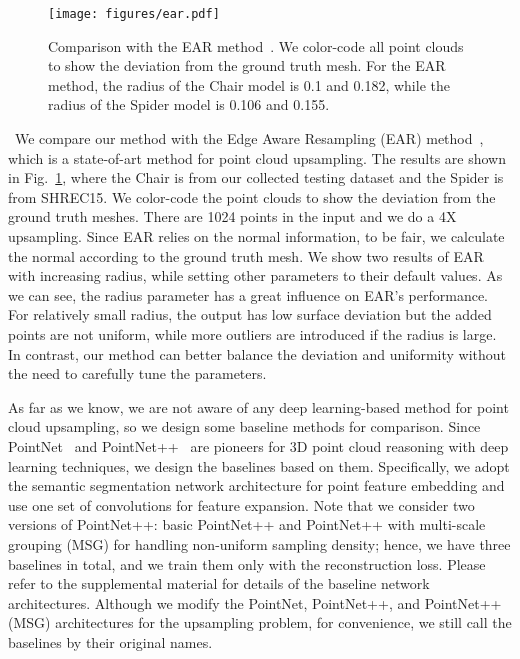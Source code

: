 \begin{figure}[t]
	\centering
	\texttt{[image: figures/ear.pdf]}\vspace{1mm}
	\caption{Comparison with the EAR method~\cite{huang2013edge}.
We color-code all point clouds to show the deviation from the ground truth mesh.
For the EAR method, the radius of the Chair model is 0.1 and 0.182, while the radius of the Spider model is 0.106 and 0.155.}
	\label{fig:ear}
	\vspace{-2mm}
\end{figure}

 \
We compare our method with the Edge Aware Resampling (EAR) method~\cite{huang2013edge}, which is a state-of-art method for point cloud upsampling.
The results are shown in Fig.~\ref{fig:ear}, where the  Chair is from our collected testing dataset and the Spider is from SHREC15.
We color-code the point clouds to show the deviation from the ground truth meshes.
There are 1024 points in the input and we do a 4X upsampling.
Since EAR relies on the normal information, to be fair, we calculate the normal according to the ground truth mesh. 
We show two results of EAR with increasing radius, while setting other parameters to their default values.
As we can see, the radius parameter has a great influence on EAR's performance. 
For relatively small radius, the output has low surface deviation but the added points are not uniform, while more outliers are introduced if the radius is large. 
In contrast, our method can better balance the deviation and uniformity without the need to carefully tune the parameters. 


As far as we know, we are not aware of any deep learning-based method for point cloud upsampling, so we design some baseline methods for comparison. 
Since PointNet~\cite{qi2016pointnet} and PointNet++~\cite{qi2017pointnet++} are pioneers for 3D point cloud reasoning with deep learning techniques, we design the baselines based on them.
Specifically, we adopt the semantic segmentation network architecture for point feature embedding and use one set of convolutions for feature expansion. 
Note that we consider two versions of PointNet++: basic PointNet++ and PointNet++ with multi-scale grouping (MSG) for handling non-uniform sampling density; hence, we have three baselines in total, and we train them only with the reconstruction loss.
Please refer to the supplemental material for details of the baseline network architectures.
Although we modify the PointNet, PointNet++, and PointNet++(MSG) architectures for the upsampling problem, for convenience, we still call the baselines by their original names.

